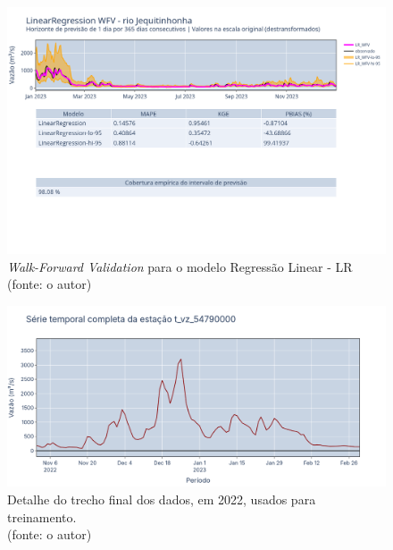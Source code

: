 \begin{figure}[!h]
\centering
\includegraphics[scale=0.33]{Figuras/jequiti/wfv/LR/LR_WFV_LOG.png}
\caption{\textit{Walk-Forward Validation} para o modelo Regressão Linear - LR\\(fonte: o autor)}
\label{fig:jequiti_LR_WFV_LOG}
\end{figure}

\begin{figure}[!h]
\centering
\includegraphics[scale=0.33]{Figuras/jequiti/LR_final_2022_detalhe.png}
\caption{Detalhe do trecho final dos dados, em 2022, usados para treinamento.\\(fonte: o autor)}
\label{fig:jequiti_LR_final_2022_detalhe}
\end{figure}


